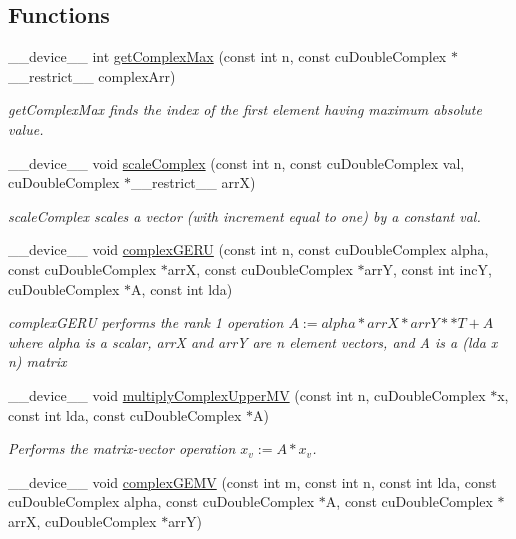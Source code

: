 \subsection*{Functions}
\begin{DoxyCompactItemize}
\item 
\+\_\+\+\_\+device\+\_\+\+\_\+ int \hyperlink{complexInverse_8cu_a8336c0132b5bf7f80e1a65443b2d9465}{get\+Complex\+Max} (const int n, const cu\+Double\+Complex $\ast$\+\_\+\+\_\+restrict\+\_\+\+\_\+ complex\+Arr)
\begin{DoxyCompactList}\small\item\em get\+Complex\+Max finds the index of the first element having maximum absolute value. \end{DoxyCompactList}\item 
\+\_\+\+\_\+device\+\_\+\+\_\+ void \hyperlink{complexInverse_8cu_aedd1b59cd1eff341e90ba6c6aaada0fd}{scale\+Complex} (const int n, const cu\+Double\+Complex val, cu\+Double\+Complex $\ast$\+\_\+\+\_\+restrict\+\_\+\+\_\+ arrX)
\begin{DoxyCompactList}\small\item\em scale\+Complex scales a vector (with increment equal to one) by a constant val. \end{DoxyCompactList}\item 
\+\_\+\+\_\+device\+\_\+\+\_\+ void \hyperlink{complexInverse_8cu_a4a5ccfb63190cc88035612f5c4cbbe5f}{complex\+G\+E\+RU} (const int n, const cu\+Double\+Complex alpha, const cu\+Double\+Complex $\ast$arrX, const cu\+Double\+Complex $\ast$arrY, const int incY, cu\+Double\+Complex $\ast$A, const int lda)
\begin{DoxyCompactList}\small\item\em complex\+G\+E\+RU performs the rank 1 operation $A := alpha * arrX * arrY **T + A$ where alpha is a scalar, arrX and arrY are n element vectors, and A is a (lda x n) matrix \end{DoxyCompactList}\item 
\+\_\+\+\_\+device\+\_\+\+\_\+ void \hyperlink{complexInverse_8cu_ad83e7dc7b03a7837b20592aabcfe107c}{multiply\+Complex\+Upper\+MV} (const int n, cu\+Double\+Complex $\ast$x, const int lda, const cu\+Double\+Complex $\ast$A)
\begin{DoxyCompactList}\small\item\em Performs the matrix-\/vector operation $x_v:= A*x_v$. \end{DoxyCompactList}\item 
\+\_\+\+\_\+device\+\_\+\+\_\+ void \hyperlink{complexInverse_8cu_ab3e9e304c4d35955cf6f79d7a5a53369}{complex\+G\+E\+MV} (const int m, const int n, const int lda, const cu\+Double\+Complex alpha, const cu\+Double\+Complex $\ast$A, const cu\+Double\+Complex $\ast$arrX, cu\+Double\+Complex $\ast$arrY)

\end{DoxyCompactItemize}
